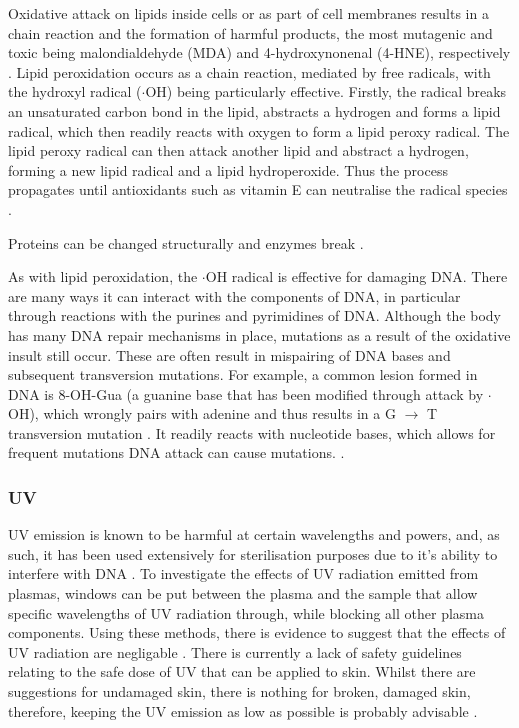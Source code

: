 \documentclass[11pt, oneside]{article}   	%
\begin{document}
Oxidative attack on lipids inside cells or as part of cell membranes results in a chain reaction and the formation of harmful products, the most mutagenic and toxic being malondialdehyde (MDA) and 4-hydroxynonenal (4-HNE), respectively \cite{Ayala2014lipid}.
Lipid peroxidation occurs as a chain reaction, mediated by free radicals, with the hydroxyl radical ($\cdot$OH) being particularly effective.
Firstly, the radical breaks an unsaturated carbon bond in the lipid, abstracts a hydrogen and forms a lipid radical, which then readily reacts with oxygen to form a lipid peroxy radical.
The lipid peroxy radical can then attack another lipid and abstract a hydrogen, forming a new lipid radical and a lipid hydroperoxide. 
Thus the process propagates until antioxidants such as vitamin E can neutralise the radical species \cite{Ayala2014lipid}.

Proteins can be changed structurally and enzymes break \cite{PhamHuy2008free}.

As with lipid peroxidation, the $\cdot$OH radical is effective for damaging DNA. 
There are many ways it can interact with the components of DNA, in particular through reactions with the purines and pyrimidines of DNA.
Although the body has many DNA repair mechanisms in place, mutations as a result of the oxidative insult still occur.
These are often result in mispairing of DNA bases and subsequent transversion mutations.
For example, a common lesion formed in DNA is 8-OH-Gua (a guanine base that has been modified through attack by $\cdot$OH), which wrongly pairs with adenine and thus results in a G $\rightarrow$ T transversion mutation \cite{Dizdaroglu2012oxidatively}.
It readily reacts with nucleotide bases, which allows for frequent mutations 
DNA attack can cause mutations. \cite{PhamHuy2008free}.







\subsubsection{UV}
UV emission is known to be harmful at certain wavelengths and powers, and, as such, it has been used extensively for sterilisation purposes due to it's ability to interfere with DNA \cite{Laroussi2004evaluation}.
To investigate the effects of UV radiation emitted from plasmas, windows can be put between the plasma and the sample that allow specific wavelengths of UV radiation through, while blocking all other plasma components. 
Using these methods, there is evidence to suggest that the effects of UV radiation are negligable \cite{Laroussi2004evaluation, Dobrynin2009physical}.
There is currently a lack of safety guidelines relating to the safe dose of UV that can be applied to skin.
Whilst there are suggestions for undamaged skin, there is nothing for broken, damaged skin, therefore, keeping the UV emission as low as possible is probably advisable \cite{Isbary2013cold}.
\end{document}
